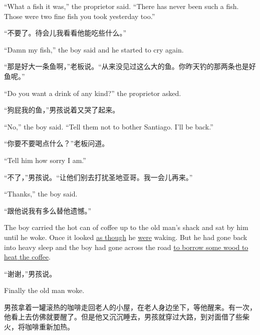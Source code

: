\begin{paracol}{2}
\switchcolumn*

``What a fish it was,'' the \gls{proprietor} said. ``There has never been
such a fish. Those were two fine fish you took yesterday too.''

\switchcolumn

“不要了。待会儿我看看他能吃些什么。”

\switchcolumn*

``Damn my fish,'' the boy said and he started to cry again.

\switchcolumn

“那是好大一条鱼啊，”老板说。“从来没见过这么大的鱼。你昨天钓的那两条也是好鱼呢。”

\switchcolumn*

``Do you want a drink of any kind?'' the proprietor asked.

\switchcolumn

“狗屁我的鱼，”男孩说着又哭了起来。

\switchcolumn*

``No,'' the boy said. ``Tell them not to \gls{bother} Santiago. I'll be
back.''

\switchcolumn

“你要不要喝点什么？”老板问道。

\switchcolumn*

``Tell him how sorry I am.''

\switchcolumn

“不了，”男孩说。“让他们别去打扰圣地亚哥。我一会儿再来。”

\switchcolumn*

``Thanks,'' the boy said.

\switchcolumn

“跟他说我有多么替他遗憾。”

\switchcolumn*

The boy carried the hot can of coffee up to the old man's shack and sat by
him until he woke. Once it looked \uline{as though} he \uline{were} waking. But he had gone
back into heavy sleep and the boy had gone across the road \uline{to borrow some
wood to \gls{heat} the coffee}.

\switchcolumn

“谢谢，”男孩说。

\switchcolumn*

Finally the old man woke.

\switchcolumn

男孩拿着一罐滚热的咖啡走回老人的小屋，在老人身边坐下，等他醒来。有一次，他看上去仿佛就要醒了。但是他又沉沉睡去，男孩就穿过大路，到对面借了些柴火，将咖啡重新加热。


\end{paracol}
